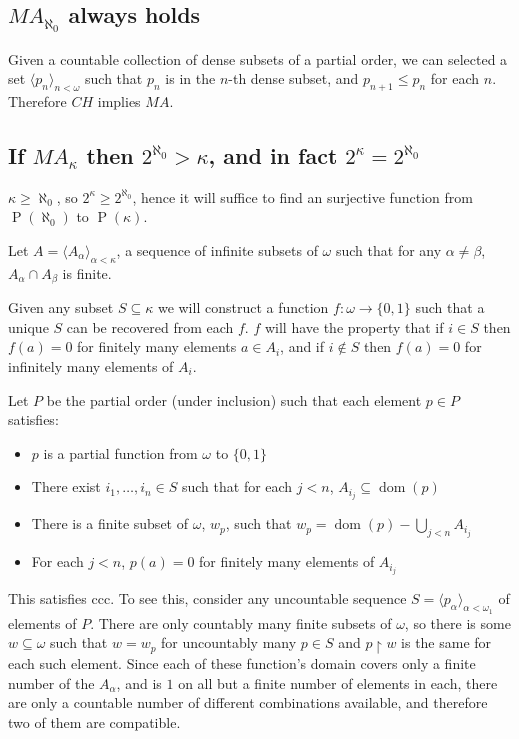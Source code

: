\documentclass[12pt]{article}
\begin{document}
\subsection*{$MA_{\aleph_0}$ always holds}

Given a countable collection of dense subsets of a partial order, we can selected a set $\langle p_n\rangle_{n<\omega}$ such that $p_n$ is in the $n$-th dense subset, and $p_{n+1}\leq p_n$ for each $n$.  Therefore $CH$ implies $MA$.

\subsection*{If $MA_\kappa$ then $2^{\aleph_0}>\kappa$, and in fact $2^\kappa=2^{\aleph_0}$}

$\kappa\geq\aleph_0$, so $2^\kappa\geq 2^{\aleph_0}$, hence it will suffice to find an surjective function from $\operatorname{P}(\aleph_0)$ to $\operatorname{P}(\kappa)$.  

Let $A=\langle A_\alpha\rangle_{\alpha<\kappa}$, a sequence of infinite subsets of $\omega$ such that for any $\alpha\neq\beta$, $A_\alpha\cap A_\beta$ is finite.

Given any subset $S\subseteq\kappa$ we will construct a function $f:\omega\rightarrow\{0,1\}$ such that a unique $S$ can be recovered from each $f$.  $f$ will have the property that if $i\in S$ then $f(a)=0$ for finitely many elements $a\in A_i$, and if $i\notin S$ then $f(a)=0$ for infinitely many elements of $A_i$.

Let $P$ be the partial order (under inclusion) such that each element $p\in P$ satisfies:
\begin{itemize}

\item $p$ is a partial function from $\omega$ to $\{0,1\}$

\item There exist $i_1,\ldots,i_n\in S$ such that for each $j<n$, $A_{i_j}\subseteq \operatorname{dom}(p)$

\item There is a finite subset of $\omega$, $w_p$, such that $w_p=\operatorname{dom}(p)-\bigcup_{j<n} A_{i_j}$

\item For each $j<n$, $p(a)=0$ for finitely many elements of $A_{i_j}$
\end{itemize}

This satisfies ccc.  To see this, consider any uncountable sequence $S=\langle p_\alpha\rangle_{\alpha<\omega_1}$ of elements of $P$.  There are only countably many finite subsets of $\omega$, so there is some $w\subseteq\omega$ such that $w=w_p$ for uncountably many $p\in S$ and $p\upharpoonright w$ is the same for each such element.  Since each of these function's domain covers only a finite number of the $A_\alpha$, and is $1$ on all but a finite number of elements in each, there are only a countable number of different combinations available, and therefore two of them are compatible.
\end{document}
